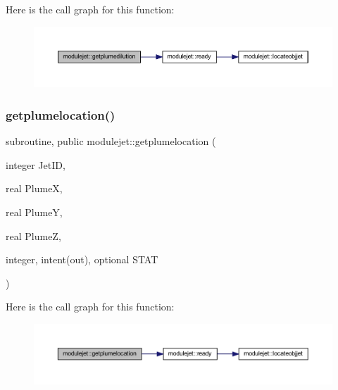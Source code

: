 Here is the call graph for this function\+:\nopagebreak
\begin{figure}[H]
\begin{center}
\leavevmode
\includegraphics[width=350pt]{namespacemodulejet_a5bd04e69691ddf86217eae82701cb7ea_cgraph}
\end{center}
\end{figure}
\mbox{\label{namespacemodulejet_a864a38eff68cbab56308586d389f202b}} 
\subsubsection{\texorpdfstring{getplumelocation()}{getplumelocation()}}
{\footnotesize\ttfamily subroutine, public modulejet\+::getplumelocation (\begin{DoxyParamCaption}\item[{integer}]{Jet\+ID,  }\item[{real}]{PlumeX,  }\item[{real}]{PlumeY,  }\item[{real}]{PlumeZ,  }\item[{integer, intent(out), optional}]{S\+T\+AT }\end{DoxyParamCaption})}

Here is the call graph for this function\+:\nopagebreak
\begin{figure}[H]
\begin{center}
\leavevmode
\includegraphics[width=350pt]{namespacemodulejet_a864a38eff68cbab56308586d389f202b_cgraph}
\end{center}
\end{figure}
\mbox{\label{namespacemodulejet_a105341ffdec09f8266a68d6db9beba7f}} 
